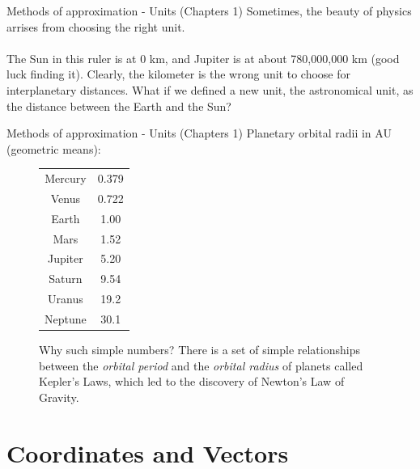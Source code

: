 \documentclass{beamer}
\begin{document}
\begin{frame}{Methods of approximation - Units (Chapters 1)}
\centering
Sometimes, the beauty of physics arrises from choosing the right unit. \\
\vspace{1cm}
\small
{} \\
\vspace{1cm}
\normalsize
The Sun in this ruler is at 0 km, and Jupiter is at about 780,000,000 km (good luck finding it).  Clearly, the kilometer is the wrong unit to choose for interplanetary distances.  What if we defined a new unit, the \alert{astronomical unit}, as the distance between the Earth and the Sun?
\end{frame}

\begin{frame}{Methods of approximation - Units (Chapters 1)}
Planetary orbital radii in \alert{AU} (geometric means):
\begin{figure}
\begin{tabular}{| c | c |}
\hline
Mercury & 0.379 \\
Venus & 0.722 \\
Earth & 1.00 \\
Mars & 1.52 \\
Jupiter & 5.20 \\
Saturn & 9.54 \\
Uranus & 19.2 \\
Neptune & 30.1 \\
\hline
\end{tabular}
\caption{\label{tab:planets} Why such simple numbers?  There is a set of simple relationships between the \textit{orbital period} and the \textit{orbital radius} of planets called Kepler's Laws, which led to the discovery of \alert{Newton's Law of Gravity.}}
\end{figure}
\end{frame}

\section{Coordinates and Vectors}
\end{document}
